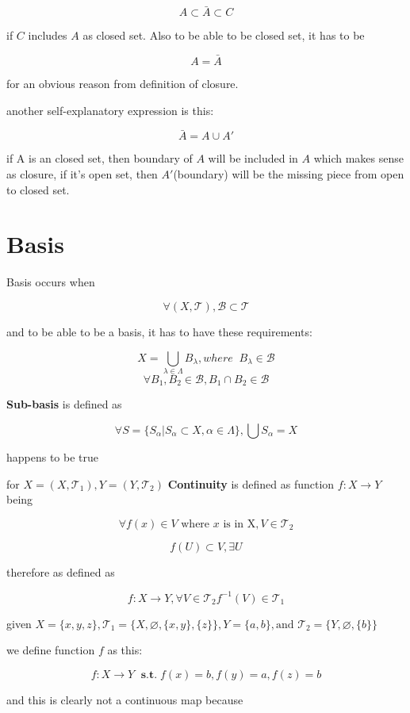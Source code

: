 \documentclass{article}
\begin{document}
\[
A\subset \bar{A} \subset C
\]

if $C$ includes $A$ as closed set. Also to be able to be closed set, it has to be

\[
A=\bar{A}
\]

for an obvious reason from definition of closure.

another self-explanatory expression is this:

\[
\bar{A}=A\cup A'
\]

if A is an closed set, then boundary of $A$ will be included in $A$ which makes sense as closure, if it's open set, then $A'$(boundary) will be the missing piece from open to closed set.

\section*{Basis}

Basis occurs when

\[
\forall (X,\mathcal{T}), \mathcal{B}\subset \mathcal{T} 
\]

and to be able to be a basis, it has to have these requirements:

\[
X=\bigcup_{\lambda\in\Lambda}B_\lambda, where \; \; B_\lambda\in\mathcal{B}
\]
\[
\forall B_1, B_2\in \mathcal{B}, B_1\cap B_2 \in \mathcal{B}
\]

\textbf{Sub-basis} is defined as

\[
\forall S=\{S_\alpha|S_\alpha\subset X, \alpha\in \Lambda\}, \bigcup S_\alpha=X
\]

happens to be true

for $X=(X,\mathcal{T}_1), Y=(Y,\mathcal{T}_2)$ \textbf{Continuity} is defined as function $f:X\rightarrow Y$ being

\[
\forall f(x)\in V \text{ where } x \text{ is in X}, V\in \mathcal{T}_2
\]

\[
f(U)\subset V, \exists U
\]

therefore as defined as 

\[
f:X\rightarrow Y, \forall V\in \mathcal{T}_2 f^{-1}(V)\in \mathcal{T}_1
\]

given $X=\{x,y,z\}, \mathcal{T}_1=\{X,\varnothing,\{x,y\},\{z\}\}, Y=\{a,b\}, \text{and } \mathcal{T}_2=\{Y,\varnothing, \{b\}\}$

we define function $f$ as this:

\[
f:X\rightarrow Y \; \textbf{ s.t.} \; f(x)=b, f(y)=a, f(z)=b
\]

and this is clearly not a continuous map because 
\end{document}
